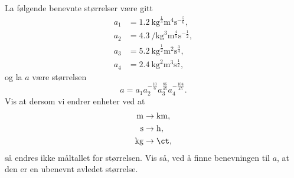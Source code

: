 \documentclass[a4paper,11pt]{article}
\begin{document}

\begin{problem}[5]
    La følgende benevnte størrelser være gitt
    \begin{align*}
      a_1 &= \SI{1.2}{\kg\tothe{\frac{1}{3}}%
                                \m\tothe{4}%
                                \s\tothe{-\frac{5}{6}}},\\
      a_2 &= \SI{4.3}{\per\kg\cubed%
                                \m\tothe{\frac{4}{5}}%
                                \s\tothe{-\frac{1}{2}}},\\
      a_3 &= \SI{5.2}{\kg\tothe{\frac{1}{2}}%
                                \m\squared%
                                \s\tothe{\frac{3}{4}}},\\
      a_4 &= \SI{2.4}{\kg\squared%
                                \m\cubed%
                                \s\tothe{\frac{1}{2}}},
    \end{align*}
    og la $a$ være størrelsen
    \begin{equation*}
      a = a_1%
          a_2^{-\frac{10}{9}}%
          a_3^{\frac{86}{45}}%
          a_4^{-\frac{104}{45}}.
    \end{equation*}
    Vis at dersom vi endrer enheter ved at
    \begin{align*}
      \si{\m} &\rightarrow \si{\km},\\
      \si{\s} &\rightarrow \si{\hour},\\
      \si{\kg} &\rightarrow \si{\ct},
    \end{align*}
    så endres ikke måltallet for størrelsen. Vis så, ved å finne benevningen til
    $a$, at den er en ubenevnt avledet størrelse.
\end{problem}
\end{document}

